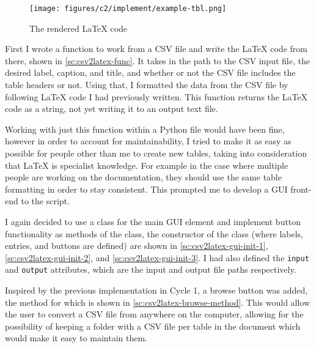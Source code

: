 \documentclass[11pt]{article}
\begin{document}
                \begin{figure}[!h]
                    \centering
                    \texttt{[image: figures/c2/implement/example-tbl.png]}
                    \caption{The rendered LaTeX code}
                    \label{fig:rendered-csv2latex-table}
                \end{figure}

                First I wrote a function to work from a CSV file and write the LaTeX code from there, shown in \autoref{sc:csv2latex-func}. 
                It takes in the path to the CSV input file, the desired label, caption, and title, and whether or not the CSV file includes the table headers or not. Using that, I formatted the data from the CSV file by following LaTeX code I had previously written. 
                This function returns the LaTeX code as a string, not yet writing it to an output text file. 

                Working with just this function within a Python file would have been fine, however in order to account for maintainability, I tried to make it as easy as possible for people other than me to create new tables, taking into consideration that LaTeX is specialist knowledge. For example in the case where multiple people are working on the documentation, they should use the same table formatting in order to stay consistent. 
                This prompted me to develop a GUI front-end to the script. 

                I again decided to use a class for the main GUI element and implement button functionality as methods of the class, the constructor of the class (where labels, entries, and buttons are defined) are shown in \autoref{sc:csv2latex-gui-init-1}, \autoref{sc:csv2latex-gui-init-2}, and \autoref{sc:csv2latex-gui-init-3}. 
                I had also defined the \verb|input| and \verb|output| attributes, which are the input and output file paths respectively. 

                Inspired by the previous implementation in Cycle 1, a browse button was added, the method for which is shown in \autoref{sc:csv2latex-browse-method}. 
                This would allow the user to convert a CSV file from anywhere on the computer, allowing for the possibility of keeping a folder with a CSV file per table in the document which would make it easy to maintain them. 



                
\end{document}
